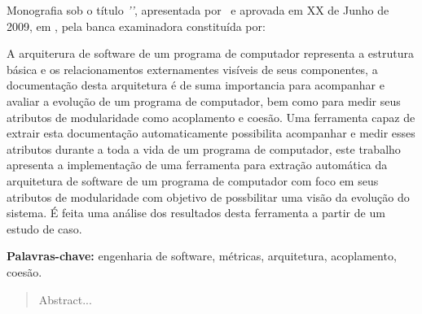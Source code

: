 

\capa
\folhaderosto

\begin{folhadeaprovacao}
 Monografia sob o título \textit{'\ABNTtitulodata'}, apresentada por
 \ABNTautordata\ e aprovada em XX de Junho de 2009, em \ABNTlocaldata, pela
 banca examinadora constituída por:
\end{folhadeaprovacao}

\begin{resumo}
A arquiterura de software de um programa de computador representa a estrutura
básica e os relacionamentos externamentes visíveis de seus componentes, a
documentação desta arquitetura é de suma importancia para acompanhar e avaliar
a evolução de um programa de computador, bem como para medir seus atributos de
modularidade como acoplamento e coesão. Uma ferramenta capaz de extrair esta
documentação automaticamente possibilita acompanhar e medir esses atributos
durante a toda a vida de um programa de computador, este trabalho apresenta a
implementação de uma ferramenta para extração automática da arquitetura de
software de um programa de computador com foco em seus atributos de
modularidade com objetivo de possbilitar uma visão da evolução do sistema. É
feita uma análise dos resultados desta ferramenta a partir de um estudo de
caso.

{\bf Palavras-chave:} engenharia de software, métricas, arquitetura,
acoplamento, coesão.
\end{resumo}

\begin{abstract}
 Abstract...
\end{abstract}

\sumario
\listadefiguras
\listadetabelas
\listadesiglas

{}
\clearpage
\apendice


